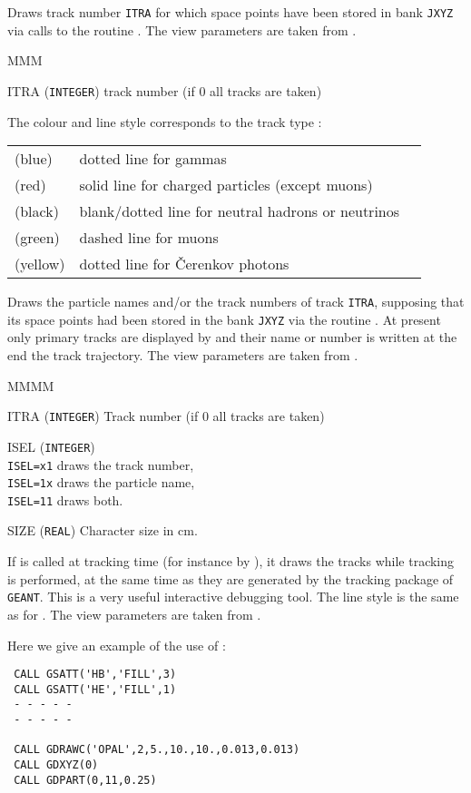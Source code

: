 Draws track number {\tt ITRA} for which space points have been stored in bank
{\tt JXYZ} via calls to the routine . The view parameters are 
taken from .
\begin{DLtt}{MMM}
\item[ITRA] ({\tt INTEGER}) track number (if 0 all tracks are taken)
\end{DLtt}
The colour and line style corresponds to the track type :
\begin{center}
\newcommand{\HSP}{\hspace{3mm}}
\newcommand{\HDD}{\makebox[2mm][c]{.}}
\newcommand{\HHH}{\makebox[2mm][c]{-}}
\newcommand{\HSPD}{\HSP\HDD\HSP\HDD\HSP\HDD\HSP\HDD\HSP\HDD\HSP\HDD}
\newcommand{\HSPH}{\HSP\HHH\HSP\HHH\HSP\HHH\HSP\HHH\HSP\HHH\HSP\HHH}
\begin{tabular}{llp{3cm}}
(blue)  & dotted line for gammas
                                                    & \dotfill \\
(red)   & solid line for charged particles (except muons)
                                                    & \hrulefill \\
(black) & blank/dotted line for neutral hadrons or neutrinos
                                                    & \HSPD \\
(green) & dashed line for muons
                                                    & \HSPH \\
(yellow) & dotted line for \v{C}erenkov photons
                                                    & \dotfill
\end{tabular}\end{center}
Draws the particle names and/or the track numbers
of track {\tt ITRA}, supposing that its space points had been stored in 
the bank {\tt JXYZ} via the routine .
At present only primary tracks are displayed by 
and their name or number is written at the end the track trajectory.
The view parameters are taken from .
\begin{DLtt}{MMMM}
\item[ITRA]  ({\tt INTEGER}) Track number (if 0 all tracks are taken)
\item[ISEL]  ({\tt INTEGER}) \\
             {\tt ISEL=x1} draws the track number, \\
             {\tt ISEL=1x} draws the particle name, \\
             {\tt ISEL=11} draws both.
\item[SIZE]  ({\tt REAL}) Character size in cm.
\end{DLtt}
If  is called at tracking time (for instance by
), it draws the tracks while tracking is performed,
at the same time as
they are generated by the tracking package of {\tt GEANT}.
This is a very
useful interactive debugging tool. The line style is the same as for
.
The view parameters are taken from .

Here we give an example of the use of :
 
\begin{verbatim}
 CALL GSATT('HB','FILL',3)
 CALL GSATT('HE','FILL',1)
 - - - - -
 - - - - -
 
 CALL GDRAWC('OPAL',2,5.,10.,10.,0.013,0.013)
 CALL GDXYZ(0)
 CALL GDPART(0,11,0.25)
\end{verbatim}
 
